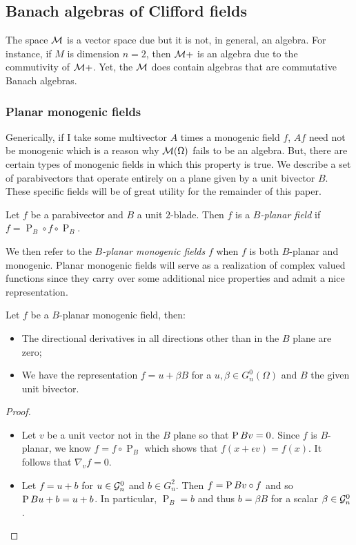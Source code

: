 \subsection{Banach algebras of Clifford fields}

The space $\mathcal{M}{}$ is a vector space due but it is not, in general, an algebra. For instance, if $M$ is dimension $n=2$, then $\mathcal{M}{+}$ is an algebra due to the commutivity of $\mathcal{M}{+}$. Yet, the $\mathcal{M}{}$ does contain algebras that are commutative Banach algebras. 

\subsubsection{Planar monogenic fields}

Generically, if I take some multivector $A$ times a monogenic field $f$, $Af$ need not be monogenic which is a reason why $\mathcal{M}(\Omega)$ fails to be an algebra. But, there are certain types of monogenic fields in which this property is true. We describe a set of parabivectors that operate entirely on a plane given by a unit bivector $B$. These specific fields will be of great utility for the remainder of this paper.
\begin{definition}
    Let $f$ be a parabivector and $B$ a unit $2$-blade. Then $f$ is a \emph{$B$-planar field} if $f = \operatorname{P}_B \circ f \circ \operatorname{P}_B$.
\end{definition} 
We then refer to the \emph{$B$-planar monogenic fields} $f$ when $f$ is both $B$-planar and monogenic. Planar monogenic fields will serve as a realization of complex valued functions since they carry over some additional nice properties and admit a nice representation.
\begin{lemma}
    Let $f$ be a $B$-planar monogenic field, then:
\begin{itemize}
    \item The directional derivatives in all directions other than in the $B$ plane are zero;
    \item We have the representation $f=u+\beta B$ for a $u,\beta \in G_n^0(\Omega)$ and $B$ the given unit bivector.
\end{itemize}
\end{lemma}
\begin{proof}
~
    \begin{itemize}
    \item Let $v$ be a unit vector not in the $B$ plane so that $\operatorname{P}{B}{v}=0$. Since $f$ is $B$-planar, we know $f=f \circ \operatorname{P}_B$ which shows that $f(x+\epsilon v)= f(x)$.  It follows that $\nabla_v f=0$.
    \item Let $f=u+b$ for $u\in \mathcal{G}_n^0$ and $b\in G_n^2$. Then $f=\operatorname{P}{B}{v} \circ f$ and so $\operatorname{P}{B}{u+b}=u+b$. In particular, $\operatorname{P}_B=b$ and thus $b=\beta B$ for a scalar $\beta \in \mathcal{G}_n^0$.
\end{itemize}
\end{proof}
